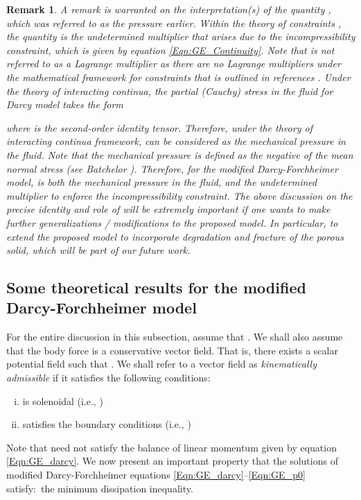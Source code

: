 \documentclass[11pt,reqno]{amsart}
\newtheorem{remark}[theorem]{Remark}
\begin{document}
\begin{remark}
  A remark is warranted on the interpretation(s) 
  of the quantity , which was 
  referred to as the pressure earlier. 
Within the theory of constraints 
  \cite{Carlson_Fried_Tortorelli_JE_2003_v70_p101,
    OReilly_Srinivasa_PRSLSA_2001_v457_p1307}, 
  the quantity  is the undetermined multiplier 
  that arises due to the incompressibility constraint, which 
  is given by equation \eqref{Eqn:GE_Continuity}. Note that 
   is not referred to as a Lagrange multiplier 
  as there are no Lagrange multipliers under the mathematical 
  framework for constraints that is outlined in references 
  \cite{Carlson_Fried_Tortorelli_JE_2003_v70_p101,
    OReilly_Srinivasa_PRSLSA_2001_v457_p1307}. 
Under the theory of interacting continua, the partial 
  (Cauchy) stress in the fluid for Darcy model takes the 
  form 

where  is the second-order identity tensor. 
  Therefore, under the theory of interacting continua 
  framework,  can be considered as the 
  mechanical pressure in the fluid. Note that the 
  mechanical pressure is defined as the negative of 
  the mean normal stress (see Batchelor \cite{Batchelor}). 
Therefore, for the modified Darcy-Forchheimer model, 
   is both the mechanical pressure in the 
  fluid, and the undetermined multiplier to enforce the 
  incompressibility constraint. The above discussion 
  on the precise identity and role of  
  will be extremely important if one wants to make 
  further generalizations / modifications to the 
  proposed model. In particular, to extend the 
  proposed model to incorporate degradation and 
  fracture of the porous solid, which will be 
  part of our future work. 
\end{remark}

\subsection{Some theoretical results for the modified 
  Darcy-Forchheimer model}
For the entire discussion in this subsection, assume that 
. We shall also assume that 
the body force is a conservative vector field. That is, 
there exists a scalar potential field  
such that . 
We shall refer to a vector field  as 
\emph{kinematically admissible} if it satisfies the 
following conditions: 
\begin{enumerate}[(i)]
\item  is solenoidal  
  (i.e., )
\item  satisfies 
  the boundary conditions (i.e., )
\end{enumerate}
Note that  
need not satisfy the balance of linear momentum 
given by equation \eqref{Eqn:GE_darcy}. We now 
present an important property that the solutions 
of modified Darcy-Forchheimer equations 
\eqref{Eqn:GE_darcy}--\eqref{Eqn:GE_p0} 
satisfy:~the minimum dissipation inequality. 
\end{document}

